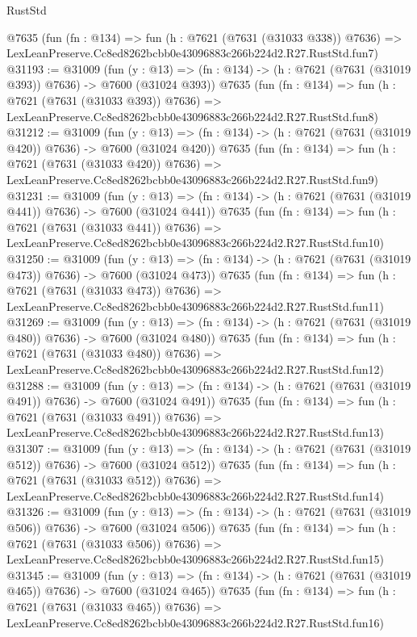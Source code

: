 \begin{lexlean}{RustStd}
\begin{coremodule}
    @7635
    (fun (fn : @134) =>
    fun (h : @7621 (@7631 (@31033 @338)) @7636) =>
    LexLeanPreserve.Cc8ed8262bcbb0e43096883c266b224d2.R27.RustStd.fun7)
@31193 := @31009
    (fun (y : @13) => (fn : @134) -> (h : @7621 (@7631 (@31019 @393)) @7636) -> @7600 (@31024 @393))
    @7635
    (fun (fn : @134) =>
    fun (h : @7621 (@7631 (@31033 @393)) @7636) =>
    LexLeanPreserve.Cc8ed8262bcbb0e43096883c266b224d2.R27.RustStd.fun8)
@31212 := @31009
    (fun (y : @13) => (fn : @134) -> (h : @7621 (@7631 (@31019 @420)) @7636) -> @7600 (@31024 @420))
    @7635
    (fun (fn : @134) =>
    fun (h : @7621 (@7631 (@31033 @420)) @7636) =>
    LexLeanPreserve.Cc8ed8262bcbb0e43096883c266b224d2.R27.RustStd.fun9)
@31231 := @31009
    (fun (y : @13) => (fn : @134) -> (h : @7621 (@7631 (@31019 @441)) @7636) -> @7600 (@31024 @441))
    @7635
    (fun (fn : @134) =>
    fun (h : @7621 (@7631 (@31033 @441)) @7636) =>
    LexLeanPreserve.Cc8ed8262bcbb0e43096883c266b224d2.R27.RustStd.fun10)
@31250 := @31009
    (fun (y : @13) => (fn : @134) -> (h : @7621 (@7631 (@31019 @473)) @7636) -> @7600 (@31024 @473))
    @7635
    (fun (fn : @134) =>
    fun (h : @7621 (@7631 (@31033 @473)) @7636) =>
    LexLeanPreserve.Cc8ed8262bcbb0e43096883c266b224d2.R27.RustStd.fun11)
@31269 := @31009
    (fun (y : @13) => (fn : @134) -> (h : @7621 (@7631 (@31019 @480)) @7636) -> @7600 (@31024 @480))
    @7635
    (fun (fn : @134) =>
    fun (h : @7621 (@7631 (@31033 @480)) @7636) =>
    LexLeanPreserve.Cc8ed8262bcbb0e43096883c266b224d2.R27.RustStd.fun12)
@31288 := @31009
    (fun (y : @13) => (fn : @134) -> (h : @7621 (@7631 (@31019 @491)) @7636) -> @7600 (@31024 @491))
    @7635
    (fun (fn : @134) =>
    fun (h : @7621 (@7631 (@31033 @491)) @7636) =>
    LexLeanPreserve.Cc8ed8262bcbb0e43096883c266b224d2.R27.RustStd.fun13)
@31307 := @31009
    (fun (y : @13) => (fn : @134) -> (h : @7621 (@7631 (@31019 @512)) @7636) -> @7600 (@31024 @512))
    @7635
    (fun (fn : @134) =>
    fun (h : @7621 (@7631 (@31033 @512)) @7636) =>
    LexLeanPreserve.Cc8ed8262bcbb0e43096883c266b224d2.R27.RustStd.fun14)
@31326 := @31009
    (fun (y : @13) => (fn : @134) -> (h : @7621 (@7631 (@31019 @506)) @7636) -> @7600 (@31024 @506))
    @7635
    (fun (fn : @134) =>
    fun (h : @7621 (@7631 (@31033 @506)) @7636) =>
    LexLeanPreserve.Cc8ed8262bcbb0e43096883c266b224d2.R27.RustStd.fun15)
@31345 := @31009
    (fun (y : @13) => (fn : @134) -> (h : @7621 (@7631 (@31019 @465)) @7636) -> @7600 (@31024 @465))
    @7635
    (fun (fn : @134) =>
    fun (h : @7621 (@7631 (@31033 @465)) @7636) =>
    LexLeanPreserve.Cc8ed8262bcbb0e43096883c266b224d2.R27.RustStd.fun16)

\end{coremodule}
\end{lexlean}
